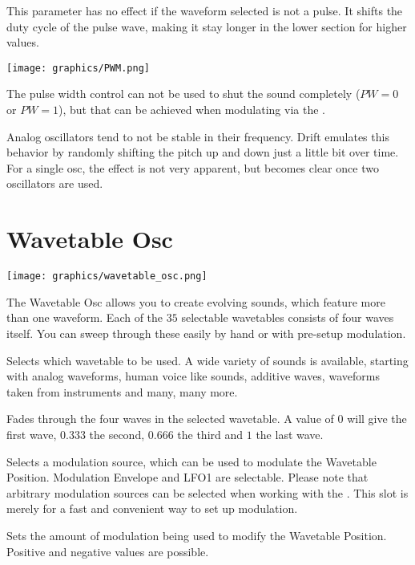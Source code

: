 {This parameter has no effect if the waveform selected is not a pulse. It shifts the duty cycle of the pulse wave, making it stay longer in the lower section for higher values.

\begin{center}
    \texttt{[image: graphics/PWM.png]}
\end{center}

The pulse width control can not be used to shut the sound completely ($PW = 0$ or $PW = 1$), but that can be achieved when modulating via the \modmatrix.}

{Analog oscillators tend to not be stable in their frequency. Drift emulates this behavior by randomly shifting the pitch up and down just a little bit over time. For a single osc, the effect is not very apparent, but becomes clear once two oscillators are used.}

\section{Wavetable Osc}
\begin{center}
    \texttt{[image: graphics/wavetable\_osc.png]}
\end{center}
The Wavetable Osc allows you to create evolving sounds, which feature more than one waveform. Each of the $35$ selectable wavetables consists of four waves itself. You can sweep through these easily by hand or with pre-setup modulation.

{Selects which wavetable to be used. A wide variety of sounds is available, starting with analog waveforms, human voice like sounds, additive waves, waveforms taken from instruments and many, many more.}

{Fades through the four waves in the selected wavetable. A value of $0$ will give the first wave, $0.333$ the second, $0.666$ the third and $1$ the last wave.}

{Selects a modulation source, which can be used to modulate the Wavetable Position. Modulation Envelope and LFO1 are selectable. Please note that arbitrary modulation sources can be selected when working with the \modmatrix. This slot is merely for a fast and convenient way to set up modulation.}

{Sets the amount of modulation being used to modify the Wavetable Position. Positive and negative values are possible.}

